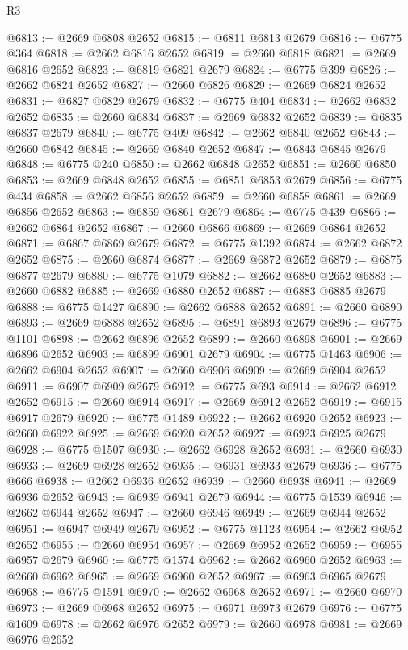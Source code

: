 \begin{lexlean}{R3}
\begin{coremodule}
@6813 := @2669 @6808 @2652
@6815 := @6811 @6813 @2679
@6816 := @6775 @364
@6818 := @2662 @6816 @2652
@6819 := @2660 @6818
@6821 := @2669 @6816 @2652
@6823 := @6819 @6821 @2679
@6824 := @6775 @399
@6826 := @2662 @6824 @2652
@6827 := @2660 @6826
@6829 := @2669 @6824 @2652
@6831 := @6827 @6829 @2679
@6832 := @6775 @404
@6834 := @2662 @6832 @2652
@6835 := @2660 @6834
@6837 := @2669 @6832 @2652
@6839 := @6835 @6837 @2679
@6840 := @6775 @409
@6842 := @2662 @6840 @2652
@6843 := @2660 @6842
@6845 := @2669 @6840 @2652
@6847 := @6843 @6845 @2679
@6848 := @6775 @240
@6850 := @2662 @6848 @2652
@6851 := @2660 @6850
@6853 := @2669 @6848 @2652
@6855 := @6851 @6853 @2679
@6856 := @6775 @434
@6858 := @2662 @6856 @2652
@6859 := @2660 @6858
@6861 := @2669 @6856 @2652
@6863 := @6859 @6861 @2679
@6864 := @6775 @439
@6866 := @2662 @6864 @2652
@6867 := @2660 @6866
@6869 := @2669 @6864 @2652
@6871 := @6867 @6869 @2679
@6872 := @6775 @1392
@6874 := @2662 @6872 @2652
@6875 := @2660 @6874
@6877 := @2669 @6872 @2652
@6879 := @6875 @6877 @2679
@6880 := @6775 @1079
@6882 := @2662 @6880 @2652
@6883 := @2660 @6882
@6885 := @2669 @6880 @2652
@6887 := @6883 @6885 @2679
@6888 := @6775 @1427
@6890 := @2662 @6888 @2652
@6891 := @2660 @6890
@6893 := @2669 @6888 @2652
@6895 := @6891 @6893 @2679
@6896 := @6775 @1101
@6898 := @2662 @6896 @2652
@6899 := @2660 @6898
@6901 := @2669 @6896 @2652
@6903 := @6899 @6901 @2679
@6904 := @6775 @1463
@6906 := @2662 @6904 @2652
@6907 := @2660 @6906
@6909 := @2669 @6904 @2652
@6911 := @6907 @6909 @2679
@6912 := @6775 @693
@6914 := @2662 @6912 @2652
@6915 := @2660 @6914
@6917 := @2669 @6912 @2652
@6919 := @6915 @6917 @2679
@6920 := @6775 @1489
@6922 := @2662 @6920 @2652
@6923 := @2660 @6922
@6925 := @2669 @6920 @2652
@6927 := @6923 @6925 @2679
@6928 := @6775 @1507
@6930 := @2662 @6928 @2652
@6931 := @2660 @6930
@6933 := @2669 @6928 @2652
@6935 := @6931 @6933 @2679
@6936 := @6775 @666
@6938 := @2662 @6936 @2652
@6939 := @2660 @6938
@6941 := @2669 @6936 @2652
@6943 := @6939 @6941 @2679
@6944 := @6775 @1539
@6946 := @2662 @6944 @2652
@6947 := @2660 @6946
@6949 := @2669 @6944 @2652
@6951 := @6947 @6949 @2679
@6952 := @6775 @1123
@6954 := @2662 @6952 @2652
@6955 := @2660 @6954
@6957 := @2669 @6952 @2652
@6959 := @6955 @6957 @2679
@6960 := @6775 @1574
@6962 := @2662 @6960 @2652
@6963 := @2660 @6962
@6965 := @2669 @6960 @2652
@6967 := @6963 @6965 @2679
@6968 := @6775 @1591
@6970 := @2662 @6968 @2652
@6971 := @2660 @6970
@6973 := @2669 @6968 @2652
@6975 := @6971 @6973 @2679
@6976 := @6775 @1609
@6978 := @2662 @6976 @2652
@6979 := @2660 @6978
@6981 := @2669 @6976 @2652

\end{coremodule}
\end{lexlean}
